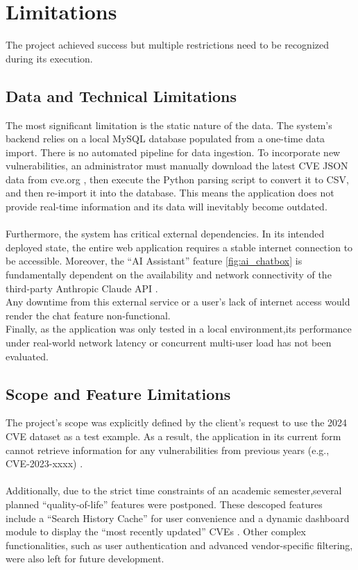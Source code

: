 \documentclass[12pt,a4paper]{article}
\begin{document}
    \section{Limitations}
    The project achieved success but multiple restrictions need to be recognized during its execution.
    \subsection{Data and Technical Limitations}
    The most significant limitation is the static nature of the data.
    The system's backend relies on a local MySQL\cite{Mysql} database populated from a one-time data import.
    There is no automated pipeline for data ingestion.
    To incorporate new vulnerabilities, an administrator must manually download the latest CVE JSON data from cve.org \cite{CVE_Program},
    then execute the Python parsing script \cite{Python} to convert it to CSV, and then re-import it into the database.
    This means the application does not provide real-time information and its data will inevitably become outdated.
    \\
    \\
    Furthermore, the system has critical external dependencies.
    In its intended deployed state, the entire web application requires a stable internet connection to be accessible.
    Moreover, the ``AI Assistant'' feature \ref{fig:ai_chatbox} is fundamentally dependent on the availability
    and network connectivity of the third-party Anthropic Claude API \cite{Claude_Sonnet}.
    \\
    Any downtime from this external service or a user's lack of internet access would render the chat feature non-functional.
    \\
    Finally, as the application was only tested in a local environment,its performance under real-world network latency or concurrent multi-user load has not been evaluated.
    \subsection{Scope and Feature Limitations}
    The project's scope was explicitly defined by the client's request to use the 2024 CVE dataset \cite{CVSS_v3_Scoring_Systems_Documentation} as a test example.
    As a result, the application in its current form cannot retrieve information for any vulnerabilities from previous years (e.g., CVE-2023-xxxx) \cite{National_Vulnerability_Database}.
    \\
    \\
    Additionally, due to the strict time constraints of an academic semester,several planned ``quality-of-life'' features were postponed.
    These descoped features include a ``Search History Cache'' for user convenience and a dynamic dashboard module to display the ``most recently updated'' CVEs \cite{CVSS_v3_Scoring_Systems_Documentation}.
    Other complex functionalities, such as user authentication and advanced vendor-specific filtering, were also left for future development.
\end{document}
